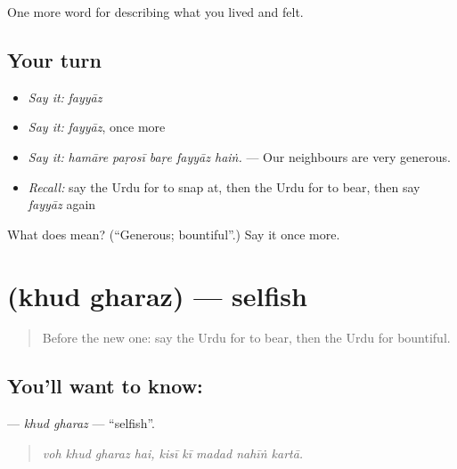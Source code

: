 \begin{grammarlens}[title={What you've built}]
One more word for describing what you lived and felt.
\end{grammarlens}

\subsection*{Your turn}
\begin{itemize}
\raggedright
  \item \emph{Say it:} \emph{fayyāz}
  \item \emph{Say it:} \emph{fayyāz}, once more
  \item \emph{Say it:} \emph{hamāre paṛosī baṛe fayyāz haiṅ.} — Our neighbours are very generous.
  \item \emph{Recall:} say the Urdu for to snap at, then the Urdu for to bear, then say \emph{fayyāz} again
\end{itemize}

\begin{tcolorbox}[breakable,colback=teal!4,colframe=teal!35!black,title={Before you move on}]
What does  mean? (\textquotedblleft{}Generous; bountiful\textquotedblright{}.) Say it once more.
\end{tcolorbox}
\section[\texorpdfstring{\ur{خود} \ur{غرض} (khud gharaz)}{خود غرض (khud gharaz)}]{  (khud gharaz) — selfish}

\label{lesson:UR-C459-khud-gharaz}



\begin{quote}
Before the new one: say the Urdu for to bear, then the Urdu for bountiful.
\end{quote}

\subsection*{You'll want to know:  }
\textbf{ } — \emph{khud gharaz} — \textquotedblleft{}selfish\textquotedblright{}.

\begin{quote}
        
\end{quote}

\begin{quote}
\emph{voh khud gharaz hai, kisī kī madad nahīṅ kartā.}
\end{quote}

